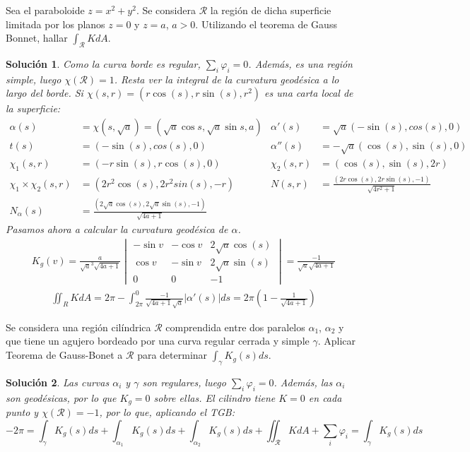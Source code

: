 \documentclass[twoside]{report}
\theoremstyle{plain}
\newtheorem*{sol*}{Solución}
\newcommand{\X}{\chi}
\newenvironment{ejercicio}[2][Estado]{\begin{trivlist}
\item[\hskip \labelsep {\bfseries Ejercicio}\hskip \labelsep {\bfseries #2.}]}{\end{trivlist}}
\begin{document}
\begin{ejercicio}{10} Sea el paraboloide $z=x^2+y^2$. Se considera $\mathcal{R}$ la región de dicha superficie limitada por los planos $z=0$ y $z=a$, $a>0$. Utilizando el teorema de Gauss Bonnet, hallar $\int_{\mathcal{R}}KdA$.
\end{ejercicio}
\begin{sol*}
Como la curva borde es regular, $\sum_i \varphi_i=0$. Además, es una región simple, luego $\chi(\mathcal{R})=1$. Resta ver la integral de la curvatura geodésica a lo largo del borde. Si $\X(s,r)=(r\cos(s),r\sin(s),r^2)$ es una carta local de la superficie:
\begin{align*}
\alpha(s)&=\X(s,\sqrt{a})=(\sqrt{a}\cos{s},\sqrt{a}\sin s,a)& \alpha'(s)&=\sqrt{a}(-\sin(s),cos(s),0)\\
t(s)&=(-\sin(s),cos(s),0) &  \alpha''(s)&=-\sqrt{a}(\cos(s),\sin(s),0)\\
\X_1(s,r)& = (-r\sin(s),r\cos(s),0) & \X_2(s,r) &= (\cos(s),\sin(s),2r)\\
\X_1 \times \X_2(s,r) & = (2 r^2 \cos(s), 2 r^2 sin(s),-r) & N(s,r)& = \frac{(2r\cos(s),2r\sin(s),-1)}{\sqrt{4r^2+1}} \\
N_\alpha(s)& = \frac{(2\sqrt{a}\cos(s),2\sqrt{a}\sin(s),-1)}{\sqrt{4a+1}} & &
\end{align*}
Pasamos ahora a calcular la curvatura geodésica de $\alpha$.
\begin{gather*}
K_g(v)=\frac{a}{\sqrt{a}^3	\sqrt{4a+1}}
\begin{vmatrix}
-\sin v & -\cos v & 2\sqrt{a}\cos(s)\\
 \cos v & -\sin v & 2\sqrt{a}\sin(s)\\
 0 		& 0		 & -1
\end{vmatrix}
=
\frac{-1}{\sqrt{a}\sqrt{4a+1}}
\end{gather*}
\begin{gather*}
\iint_R K dA = 2\pi - \int_{2\pi}^0 \frac{-1}{\sqrt{4a+1}\sqrt{a}} |\alpha'(s)| ds =2\pi \left(1-\frac{1}{\sqrt{4a+1}}\right)
\end{gather*}
\end{sol*}
\newpage
\begin{ejercicio}{11} Se considera una región cilíndrica $\mathcal{R}$ comprendida entre dos paralelos $\alpha_1$, $\alpha_2$ y que tiene un agujero bordeado por una curva regular cerrada y simple $\gamma$. Aplicar Teorema de Gauss-Bonet a $\mathcal{R}$ para determinar $\int_\gamma K_g(s)ds$.
\end{ejercicio}
\begin{sol*}
Las curvas $\alpha_i$ y $\gamma$ son regulares, luego $\sum_i \varphi_i =0$. Además, las $\alpha_i$ son geodésicas, por lo que $K_g=0$ sobre ellas. El cilindro tiene $K=0$ en cada punto y $\chi(\mathcal{R})=-1$, por lo que, aplicando el TGB:
\[
-2\pi = \int_\gamma K_g(s)ds + \int_{\alpha_1} K_g(s)ds + \int_{\alpha_2} K_g(s)ds+  \iint_{\mathcal{R}} KdA + \sum_i \varphi_i = \int_\gamma K_g(s)ds 
\]
\end{sol*}
\end{document}
